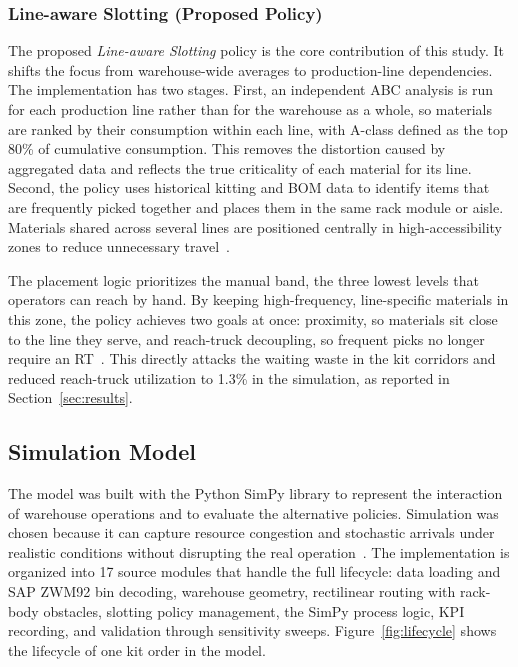 \documentclass[conference]{IEEEtran}
\newcommand{\policy}[1]{\textit{#1}}
\begin{document}
\subsubsection{Line-aware Slotting (Proposed Policy)}
The proposed \policy{Line-aware Slotting} policy is the core contribution of
this study. It shifts the focus from warehouse-wide averages to
production-line dependencies. The implementation has two stages. First, an
independent ABC analysis is run for each production line rather than for the
warehouse as a whole, so materials are ranked by their consumption within each
line, with A-class defined as the top 80\% of cumulative consumption. This
removes the distortion caused by aggregated data and reflects the true
criticality of each material for its line. Second, the policy uses historical
kitting and BOM data to identify items that are frequently picked together and
places them in the same rack module or aisle. Materials shared across several
lines are positioned centrally in high-accessibility zones to reduce
unnecessary travel~\cite{hanson2012,limere2012}.

The placement logic prioritizes the manual band, the three lowest levels that
operators can reach by hand. By keeping high-frequency, line-specific
materials in this zone, the policy achieves two goals at once: proximity, so
materials sit close to the line they serve, and reach-truck decoupling, so
frequent picks no longer require an RT~\cite{dekoster2007}. This directly
attacks the waiting waste in the kit corridors and reduced reach-truck
utilization to 1.3\% in the simulation, as reported in Section~\ref{sec:results}.

\subsection{Simulation Model}
The model was built with the Python SimPy library to represent the
interaction of warehouse operations and to evaluate the alternative policies.
Simulation was chosen because it can capture resource congestion and
stochastic arrivals under realistic conditions without disrupting the real
operation~\cite{gu2007,negahban2014,banks2010}. The implementation is
organized into 17 source modules that handle the full lifecycle: data loading
and SAP ZWM92 bin decoding, warehouse geometry, rectilinear routing with
rack-body obstacles, slotting policy management, the SimPy process logic, KPI
recording, and validation through sensitivity sweeps.
Figure~\ref{fig:lifecycle} shows the lifecycle of one kit order in the model.
\end{document}
